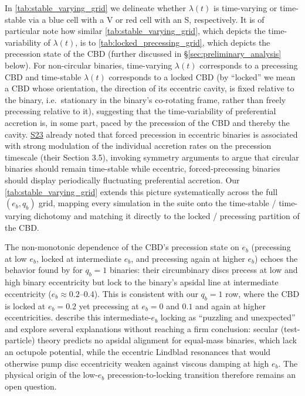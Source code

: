 \documentclass[fleqn,usenatbib]{mnras}
\newcommand{\Stwentythree}{\href{https://doi.org/10.1093/mnras/stac3263}{S23}\xspace}
\begin{document}
In \autoref{tab:stable_varying_grid} we delineate whether $\lambda(t)$ is time-varying or time-stable via a blue cell with a V or red cell with an S, respectively. It is of particular note how similar \autoref{tab:stable_varying_grid}, which depicts the time-variability of $\lambda(t)$, is to \autoref{tab:locked_precessing_grid}, which depicts the precession state of the CBD (further discussed in \S\ref{sec:preliminary_analysis} below). For non-circular binaries, time-varying $\lambda(t)$ corresponds to a precessing CBD and time-stable $\lambda(t)$ corresponds to a locked CBD (by ``locked'' we mean a CBD whose orientation, the direction of its eccentric cavity, is fixed relative to the binary, i.e.\ stationary in the binary's co-rotating frame, rather than freely precessing relative to it), suggesting that the time-variability of preferential accretion is, in some part, paced by the precession of the CBD and thereby the cavity. \Stwentythree already noted that forced precession in eccentric binaries is associated with strong modulation of the individual accretion rates on the precession timescale (their Section 3.5), invoking symmetry arguments to argue that circular binaries should remain time-stable while eccentric, forced-precessing binaries should display periodically fluctuating preferential accretion. Our \autoref{tab:stable_varying_grid} extends this picture systematically across the full $(e_b, q_b)$ grid, mapping every simulation in the suite onto the time-stable / time-varying dichotomy and matching it directly to the locked / precessing partition of the CBD.

The non-monotonic dependence of the CBD's precession state on $e_b$ (precessing at low $e_b$, locked at intermediate $e_b$, and precessing again at higher $e_b$) echoes the behavior found by \citet{miranda_munoz_lai_2017} for $q_b = 1$ binaries: their circumbinary discs precess at low and high binary eccentricity but lock to the binary's apsidal line at intermediate eccentricity ($e_b \approx 0.2$--$0.4$). This is consistent with our $q_b = 1$ row, where the CBD is locked at $e_b = 0.2$ yet precessing at $e_b = 0$ and $0.1$ and again at higher eccentricities. \citet{miranda_munoz_lai_2017} describe this intermediate-$e_b$ locking as ``puzzling and unexpected'' and explore several explanations without reaching a firm conclusion: secular (test-particle) theory predicts no apsidal alignment for equal-mass binaries, which lack an octupole potential, while the eccentric Lindblad resonances that would otherwise pump disc eccentricity weaken against viscous damping at high $e_b$. The physical origin of the low-$e_b$ precession-to-locking transition therefore remains an open question.
\end{document}
